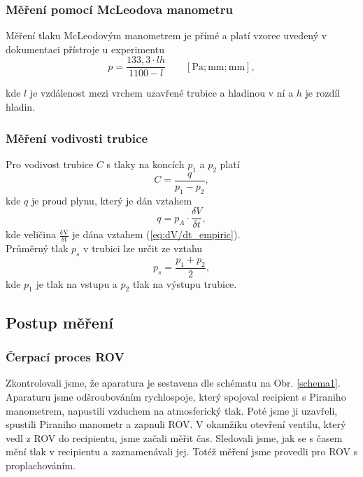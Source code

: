 \documentclass[english]{article}
\newcommand{\unit}[1]{\mathrm{#1}}
\begin{document}
	\subsubsection{Měření pomocí McLeodova manometru}
	
	Měření tlaku McLeodovým manometrem je přímé a platí vzorec uvedený
	v dokumentaci přístroje u experimentu
	\begin{equation}
	p=\frac{133,3\cdot lh}{1100-l}\qquad\unit{[Pa;mm;mm]},\label{tlak}
	\end{equation}
	
	kde $l$ je vzdálenost mezi vrchem uzavřené trubice a hladinou v ní
	a $h$ je rozdíl hladin. 
	
	\subsubsection{Měření vodivosti trubice}
	Pro vodivost trubice $ C $ s tlaky na koncích $ p_1 $ a $ p_2 $ platí
	\begin{equation}
	C = \frac{q}{p_1 - p_2},
	\label{vodivost_trubice}
	\end{equation}
	kde $ q $ je proud plynu, který je dán vztahem 
	\begin{equation}
	q = p_A\cdot \frac{\delta V}{\delta t},
	\label{proud}
	\end{equation}
	kde veličina $ \mathrm{\frac{\delta V}{\delta t}} $ je dána vztahem (\ref{eq:dV/dt_empiric}).\\
	
	Průměrný tlak $ p_s $ v trubici lze určit ze vztahu
	\begin{equation}
	p_s = \frac{p_1 + p_2}{2},
	\label{pruměr_tlak}
	\end{equation}
	kde $ p_1 $ je tlak na vstupu a $ p_2 $ tlak na výstupu trubice.
			
\subsection{Postup měření}

	\subsubsection{Čerpací proces ROV}
	
	Zkontrolovali jsme, že aparatura je sestavena dle schématu na Obr. \ref{schema1}. Aparaturu jsme odšroubováním rychlospoje, který spojoval recipient s Piraniho manometrem, napustili vzduchem na atmosferický tlak. Poté jsme ji uzavřeli, spustili Piraniho manometr a zapnuli ROV. V okamžiku otevření ventilu, který vedl z ROV do recipientu, jsme začali měřit čas. Sledovali jsme, jak se s časem mění tlak v recipientu a zaznamenávali jej. Totéž měření jsme provedli pro ROV s proplachováním.
	
\end{document}
